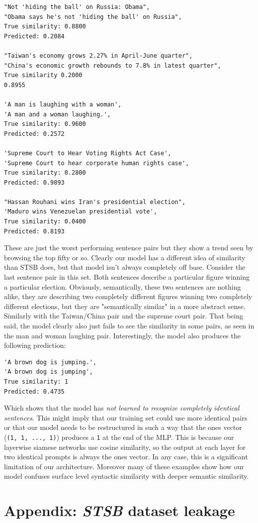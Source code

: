 \documentclass[14pt]{article}
\begin{document}
\begin{verbatim}
"Not 'hiding the ball' on Russia: Obama",
"Obama says he's not 'hiding the ball' on Russia",
True similarity: 0.8800
Predicted: 0.2084

"Taiwan's economy grows 2.27% in April-June quarter",
"China's economic growth rebounds to 7.8% in latest quarter",
True similarity 0.2000
0.8955

'A man is laughing with a woman',
'A man and a woman laughing.',
True similarity: 0.9600
Predicted: 0.2572

'Supreme Court to Hear Voting Rights Act Case',
'Supreme Court to hear corporate human rights case',
True similarity: 0.2800
Predicted: 0.9893

"Hassan Rouhani wins Iran's presidential election",
'Maduro wins Venezuelan presidential vote',
True similarity: 0.0400
Predicted: 0.8193
\end{verbatim}
These are just the worst performing sentence pairs but they show a trend seen by browsing the top fifty or so. Clearly our model has a different idea of similarity than STSB does, but that model isn't always completely off base. Consider the last sentence pair in this set. Both sentences describe a particular figure winning a particular election. Obviously, semantically, these two sentences are nothing alike, they are describing two completely different figures winning two completely different elections, but they are "semantically similar" in a more abstract sense. Similarly with the Taiwan/China pair and the supreme court pair. That being said, the model clearly also just fails to see the similarity in some pairs, as seen in the man and woman laughing pair. Interestingly, the model also produces the following prediction:
\begin{verbatim}
'A brown dog is jumping.',
'A brown dog is jumping',
True similarity: 1
Predicted: 0.4735
\end{verbatim}
Which shows that the model has \textit{not learned to recognize completely identical sentences}. This might imply that our training set could use more identical pairs or that our model needs to be restructured in such a way that the ones vector (\verb|(1, 1, ..., 1)|) produces a \verb|1| at the end of the MLP. This is because our layerwise siamese networks use cosine similarity, so the output at each layer for two identical prompts is always the ones vector. In any case, this is a significant limitation of our architecture. Moreover many of these examples show how our model confuses surface level syntactic similarity with deeper semantic similarity.

\newpage
\section{Appendix: \textit{STSB} dataset leakage} 
\newpage
{}

\end{document}
